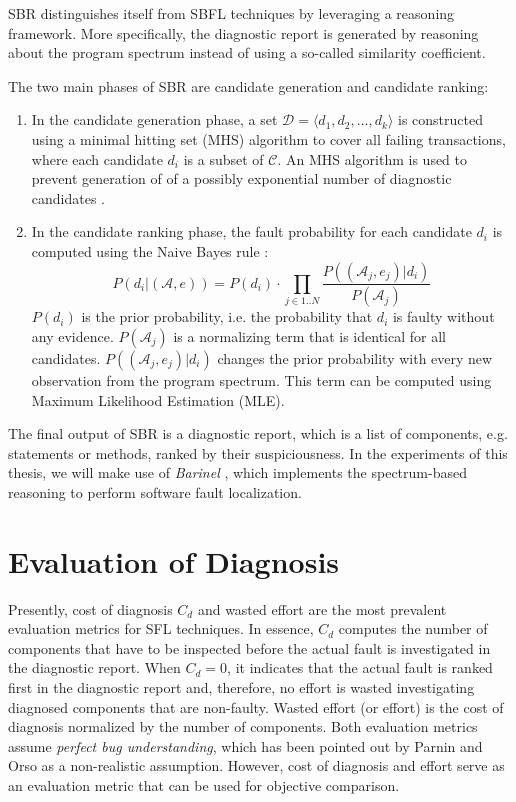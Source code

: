 \documentclass[twoside,a4paper,11pt]{memoir}
\begin{document}
SBR distinguishes itself from SBFL techniques by leveraging a reasoning framework.
More specifically, the diagnostic report is generated by reasoning about the program spectrum instead of using a so-called similarity coefficient.

The two main phases of SBR are candidate generation and candidate ranking:
\begin{enumerate}
  \item In the candidate generation phase, a set $\mathcal{D} = \langle d_1, d_2, \dots, d_k \rangle$ is constructed using a minimal hitting set (MHS) algorithm to cover all failing transactions, where each candidate $d_i$ is a subset of $\mathcal{C}$.
  An MHS algorithm is used to prevent generation of of a possibly exponential number of diagnostic candidates \cite{Abreu:2009:SMF:1747491.1747511}.

  \item In the candidate ranking phase, the fault probability for each candidate $d_i$ is computed using the Naive Bayes rule \cite{Abreu:2009:SMF:1747491.1747511}:
  \begin{equation}
    P(d_i | (\mathcal{A}, e)) = P(d_i) \cdot \prod_{j \in 1..N} \frac{P((\mathcal{A}_j, e_j) | d_i)}{P(\mathcal{A}_j)}
  \end{equation}
  $P(d_i)$ is the prior probability, i.e. the probability that $d_i$ is faulty without any evidence.
  $P(\mathcal{A}_j)$ is a normalizing term that is identical for all candidates.
  $P((\mathcal{A}_j, e_j) | d_i)$ changes the prior probability with every new observation from the program spectrum.
  This term can be computed using Maximum Likelihood Estimation (MLE).
\end{enumerate}

The final output of SBR is a diagnostic report, which is a list of components, e.g. statements or methods, ranked by their suspiciousness.
In the experiments of this thesis, we will make use of \emph{Barinel} \cite{Abreu:2009:SMF:1747491.1747511}, which implements the spectrum-based reasoning to perform software fault localization.

\section{Evaluation of Diagnosis}
Presently, cost of diagnosis $C_d$ and wasted effort are the most prevalent evaluation metrics for SFL techniques.
In essence, $C_d$ computes the number of components that have to be inspected before the actual fault is investigated in the diagnostic report.
When $C_d = 0$, it indicates that the actual fault is ranked first in the diagnostic report and, therefore, no effort is wasted investigating diagnosed components that are non-faulty.
Wasted effort (or effort) is the cost of diagnosis normalized by the number of components.
Both evaluation metrics assume \emph{perfect bug understanding}, which has been pointed out by Parnin and Orso \cite{Parnin:2011:ADT:2001420.2001445} as a non-realistic assumption.
However, cost of diagnosis and effort serve as an evaluation metric that can be used for objective comparison.
\end{document}
